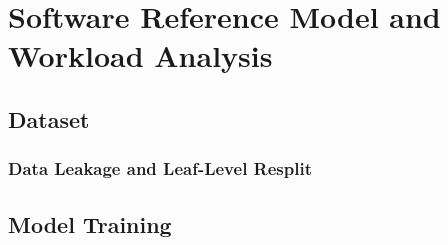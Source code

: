 %
\chapter{Software Reference Model and Workload Analysis}
\label{ch:software}

\section{Dataset}
\label{sec:dataset}

\subsection{Data Leakage and Leaf-Level Resplit}
\label{sec:leakage}
%

\section{Model Training}
\label{sec:training}

